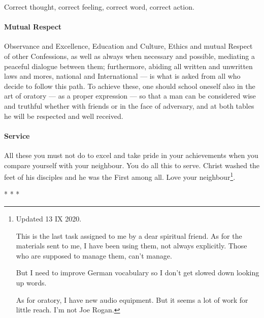 Correct thought, correct feeling, correct word, correct action.

\paragraph{Mutual Respect}
Observance and Excellence, Education and Culture, Ethics and mutual Respect of other Confessions, as well as always when necessary and possible, mediating a peaceful dialogue between them; furthermore, abiding all written and unwritten laws and mores, national and International — is what is asked from all who decide to follow this path. To achieve these, one should school oneself also in the art of oratory — as a proper expression — so that a man can be considered wise and truthful whether with friends or in the face of adversary, and at both tables he will be respected and well received.

\paragraph{Service}
All these you must not do to excel and take pride in your achievements when you compare yourself with your neighbour. You do all this to serve. Christ washed the feet of his disciples and he was the First among all. Love your neighbour\footnote{Updated 13 IX 2020.

This is the last task assigned to me by a dear spiritual friend. As for the materials sent to me, I have been using them, not always explicitly. Those who are supposed to manage them, can't manage.

But I need to improve German vocabulary so I don't get slowed down looking up words.

As for oratory, I have new audio equipment. But it seems a lot of work for little reach. I'm not Joe Rogan.}.




\begin{center}* * *\end{center}

